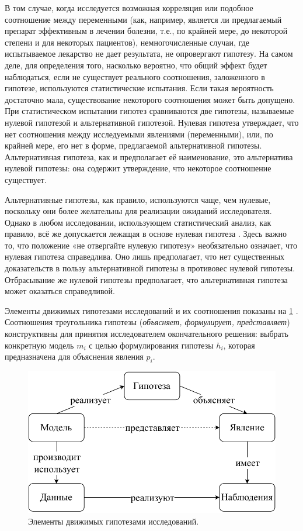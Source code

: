 В том случае, когда исследуется возможная корреляция или подобное соотношение между переменными (как, например, 
является ли предлагаемый препарат эффективным в лечении болезни, т.е., по крайней мере, до некоторой степени и для 
некоторых пациентов), немногочисленные случаи, где испытываемое лекарство не дает результата, не опровергают гипотезу. 
На самом деле, для определения того, насколько вероятно, что общий эффект будет наблюдаться, если не существует 
реального соотношения, заложенного в гипотезе, используются статистические испытания. Если такая вероятность достаточно 
мала, существование некоторого соотношения может быть допущено. При статистическом испытании гипотез сравниваются две 
гипотезы, называемые нулевой гипотезой и альтернативной гипотезой. Нулевая гипотеза утверждает, что нет соотношения 
между исследуемыми явлениями (переменными), или, по крайней мере, его нет в форме, предлагаемой альтернативной 
гипотезы. Альтернативная гипотеза, как и предполагает её наименование, это альтернатива нулевой гипотезы: она содержит 
утверждение, что некоторое соотношение существует.

Альтернативные гипотезы, как правило, используются чаще, чем нулевые, поскольку они более желательны для реализации 
ожиданий исследователя. Однако в любом исследовании, использующем статистический анализ, как правило, всё же 
допускается лежащая в основе нулевая гипотеза \cite{Haber2009}. Здесь важно то, что положение «не отвергайте нулевую 
гипотезу» необязательно означает, что нулевая гипотеза справедлива. Оно лишь предполагает, что нет существенных 
доказательств в пользу альтернативной гипотезы в противовес нулевой гипотезы. Отбрасывание же нулевой гипотезы 
предполагает, что альтернативная гипотеза может оказаться справедливой.

Элементы движимых гипотезами исследований и их соотношения показаны на \cref{fig:hypothesis_real} 
\cite{Goncalves2013, Porto2011}. Соотношения треугольника гипотезы (\textit{объясняет, формулирует, представляет}) 
конструктивны для принятия исследователем окончательного решения: выбрать конкретную модель $m_i$ с целью 
формулирования гипотезы $h_i$, которая предназначена для объяснения явления $p_i$. 

\begin{figure}[ht]
    \centering
    \includegraphics[width=0.7\linewidth]{images/hypothesis_real}
    \caption{Элементы движимых гипотезами исследований.}\label{fig:hypothesis_real}
\end{figure}

